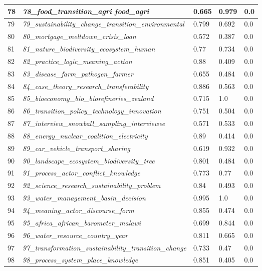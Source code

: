 \documentclass[12pt]{article}
\begin{document}
\begin{longtable}{|l|l|l|l|l|}
78 & \textit{78\_food\_transition\_agri food\_agri} & 0.665 & 0.979 & 0.0 \\ \hline
79 & \textit{79\_sustainability\_change\_transition\_environmental} & 0.799 & 0.692 & 0.0 \\ \hline
80 & \textit{80\_mortgage\_meltdown\_crisis\_loan} & 0.572 & 0.387 & 0.0 \\ \hline
81 & \textit{81\_nature\_biodiversity\_ecosystem\_human} & 0.77 & 0.734 & 0.0 \\ \hline
82 & \textit{82\_practice\_logic\_meaning\_action} & 0.88 & 0.409 & 0.0 \\ \hline
83 & \textit{83\_disease\_farm\_pathogen\_farmer} & 0.655 & 0.484 & 0.0 \\ \hline
84 & \textit{84\_case\_theory\_research\_transferability} & 0.886 & 0.563 & 0.0 \\ \hline
85 & \textit{85\_bioeconomy\_bio\_biorefineries\_zealand} & 0.715 & 1.0 & 0.0 \\ \hline
86 & \textit{86\_transition\_policy\_technology\_innovation} & 0.751 & 0.504 & 0.0 \\ \hline
87 & \textit{87\_interview\_snowball\_sampling\_interviewee} & 0.571 & 0.533 & 0.0 \\ \hline
88 & \textit{88\_energy\_nuclear\_coalition\_electricity} & 0.89 & 0.414 & 0.0 \\ \hline
89 & \textit{89\_car\_vehicle\_transport\_sharing} & 0.619 & 0.932 & 0.0 \\ \hline
90 & \textit{90\_landscape\_ecosystem\_biodiversity\_tree} & 0.801 & 0.484 & 0.0 \\ \hline
91 & \textit{91\_process\_actor\_conflict\_knowledge} & 0.773 & 0.77 & 0.0 \\ \hline
92 & \textit{92\_science\_research\_sustainability\_problem} & 0.84 & 0.493 & 0.0 \\ \hline
93 & \textit{93\_water\_management\_basin\_decision} & 0.995 & 1.0 & 0.0 \\ \hline
94 & \textit{94\_meaning\_actor\_discourse\_form} & 0.855 & 0.474 & 0.0 \\ \hline
95 & \textit{95\_africa\_african\_barometer\_malawi} & 0.699 & 0.844 & 0.0 \\ \hline
96 & \textit{96\_water\_resource\_country\_year} & 0.811 & 0.665 & 0.0 \\ \hline
97 & \textit{97\_transformation\_sustainability\_transition\_change} & 0.733 & 0.47 & 0.0 \\ \hline
98 & \textit{98\_process\_system\_place\_knowledge} & 0.851 & 0.405 & 0.0 \\ \hline

\end{longtable}
\end{document}
